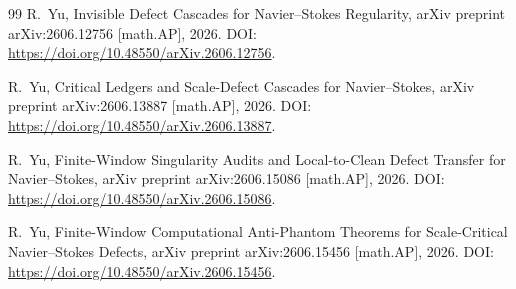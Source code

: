 \documentclass[11pt]{article}
\numberwithin{equation}{section}
\theoremstyle{plain}
\theoremstyle{definition}
\theoremstyle{remark}
\begin{document}
\begin{thebibliography}{99}
R.~Yu,
\newblock Invisible Defect Cascades for Navier--Stokes Regularity,
\newblock arXiv preprint arXiv:2606.12756 [math.AP], 2026.
\newblock DOI: \url{https://doi.org/10.48550/arXiv.2606.12756}.

R.~Yu,
\newblock Critical Ledgers and Scale-Defect Cascades for Navier--Stokes,
\newblock arXiv preprint arXiv:2606.13887 [math.AP], 2026.
\newblock DOI: \url{https://doi.org/10.48550/arXiv.2606.13887}.

R.~Yu,
\newblock Finite-Window Singularity Audits and Local-to-Clean Defect Transfer for Navier--Stokes,
\newblock arXiv preprint arXiv:2606.15086 [math.AP], 2026.
\newblock DOI: \url{https://doi.org/10.48550/arXiv.2606.15086}.

R.~Yu,
\newblock Finite-Window Computational Anti-Phantom Theorems for Scale-Critical Navier--Stokes Defects,
\newblock arXiv preprint arXiv:2606.15456 [math.AP], 2026.
\newblock DOI: \url{https://doi.org/10.48550/arXiv.2606.15456}.

\end{thebibliography}
\end{document}
